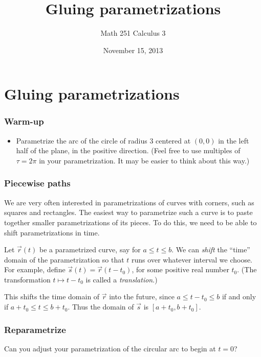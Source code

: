 \documentclass[11pt,ignorenonframetext,aspectratio=169,xcolor={svgnames}]{beamer}
\title{Gluing parametrizations}
\author{Math 251 Calculus 3}
\date{November 15, 2013}
\begin{document}
\frame{\titlepage}

\section{Gluing parametrizations}

\begin{frame}\frametitle{Warm-up}

\begin{itemize}[<+->]
\itemsep1pt\parskip0pt
\item
  Parametrize the arc of the circle of radius $3$ centered at $(0,0)$ in
  the left half of the plane, in the positive direction. (Feel free to
  use multiples of $\tau = 2\pi$ in your parametrization. It may be
  easier to think about this way.)
\end{itemize}

\end{frame}

\begin{frame}\frametitle{Piecewise paths}

We are very often interested in parametrizations of curves with corners,
such as squares and rectangles. The easiest way to parametrize such a
curve is to paste together smaller parametrizations of its pieces. To do
this, we need to be able to shift parametrizations in time.

Let $\vec{r}(t)$ be a parametrized curve, say for $a \leq t \leq b$. We
can \emph{shift} the ``time'' domain of the parametrization so that $t$
runs over whatever interval we choose. For example, define
$\vec{s}(t) = \vec{r}(t - t_0)$, for some positive real number $t_0$.
(The transformation $t \mapsto t - t_0$ is called a \emph{translation}.)

This shifts the time domain of $\vec{r}$ into the future, since
$a \leq t - t_0 \leq b$ if and only if $a + t_0 \leq t \leq b + t_0$.
Thus the domain of $\vec{s}$ is $[a + t_0, b+t_0]$.

\end{frame}

\begin{frame}\frametitle{Reparametrize}

Can you adjust your parametrization of the circular arc to begin at
$t = 0$?

\end{frame}
\end{document}
